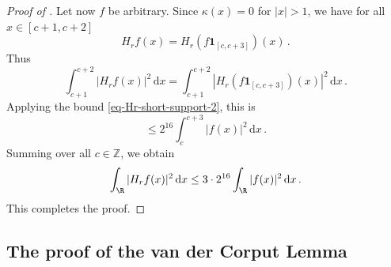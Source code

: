 \begin{proof}[Proof of ]
    Let now $f$ be arbitrary.
    Since $\kappa(x) = 0$ for $|x| > 1$, we have for all $x \in [c+1, c+2]$
    $$
        H_rf(x) = H_r(f \mathbf{1}_{[c, c+3]})(x)\,.
    $$
    Thus
    $$
        \int_{c+1}^{c+2} |H_r f(x)|^2 \, \mathrm{d}x = \int_{c+1}^{c+2}|H_r(f \mathbf{1}_{[c, c+3]})(x)|^2 \, \mathrm{d}x\,.
    $$
    Applying the bound \eqref{eq-Hr-short-support-2}, this is
    $$
        \le 2^{16} \int_{c}^{c+3} |f(x)|^2 \, \mathrm{d}x\,.
    $$
    Summing over all $c \in \mathbb{Z}$, we obtain
    $$
        \int_{\R} |H_rf(x)|^2 \, \mathrm{d}x \le 3 \cdot 2^{16} \int_{\R} |f(x)|^2 \, \mathrm{d}x\,.
    $$
    This completes the proof.
\end{proof}







\subsection{The proof of the van der Corput Lemma}
\label{10vandercorput}

